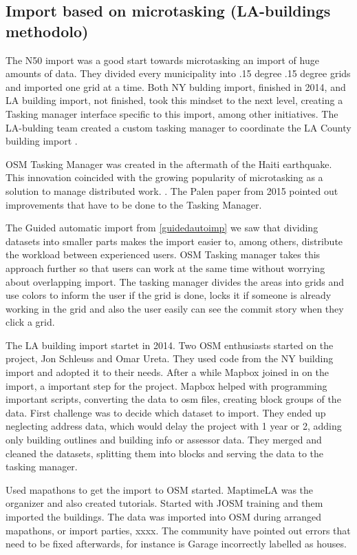 \subsection{Import based on microtasking (LA-buildings methodolo)}
The N50 import was a good start towards microtasking an import of huge amounts of data. They divided every municipality into .15 degree .15 degree grids and imported one grid at a time. Both NY bulding import, finished in 2014, and LA building import, not finished, took this mindset to the next level, creating a Tasking manager interface specific to this import, among other initiatives.  The LA-bulding team created a custom tasking manager to coordinate the LA County building import \cite{OSMTaskingManager}. 

OSM Tasking Manager was created in the aftermath of the Haiti earthquake. This innovation coincided with the growing popularity of microtasking as a solution to manage distributed work. \cite{Palen2015}. The Palen paper from 2015 pointed out improvements that have to be done to the Tasking Manager. %

The Guided automatic import from \ref{guidedautoimp} we saw that dividing datasets into smaller parts makes the import easier to, among others, distribute the workload between experienced users. OSM Tasking manager takes this approach further so that users can work at the same time without worrying about overlapping import. The tasking manager divides the areas into grids and use colors to inform the user if the grid is done, locks it if someone is already working in the grid and also the user easily can see the commit story when they click a grid. 

The LA building import startet in 2014. Two OSM enthusiasts started on the project, Jon Schleuss and Omar Ureta. They used code from the NY building import and adopted it to their needs. After a while Mapbox joined in on the import, a important step for the project. Mapbox helped with programming important scripts, converting the data to osm files, creating block groups of the data. First challenge was to decide which dataset to import.  They ended up neglecting address data, which would delay the project with 1 year or 2, adding only building outlines and building info or assessor data. They merged and cleaned the datasets, splitting them into blocks and serving the data to the tasking manager. 

Used mapathons to get the import to OSM started. MaptimeLA was the organizer and also created tutorials. Started with JOSM training and them imported the buildings. The data was imported into OSM during arranged mapathons, or import parties, xxxx. The community have pointed out errors that need to be fixed afterwards, for instance is Garage incorrectly labelled as houses. 


